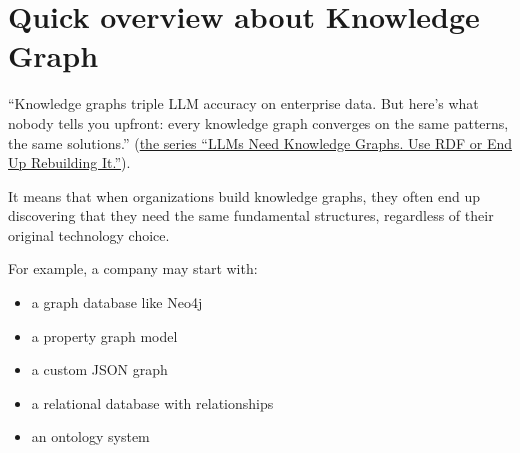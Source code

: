 \section{Quick overview about Knowledge Graph}

``Knowledge graphs triple LLM accuracy on enterprise data. But here's what nobody tells you upfront: every knowledge graph converges on the same patterns, the same solutions.''
(\href{https://bryon.io/why-rdf-is-the-natural-knowledge-layer-for-ai-systems-a5fd0b43d4c5}{the series “LLMs Need Knowledge Graphs. Use RDF or End Up Rebuilding It.”}).

It means that when organizations build knowledge graphs, they often end up discovering that they need the same fundamental structures, regardless of their original technology choice.

For example, a company may start with:
\begin{itemize}
  \item a graph database like Neo4j
  \item a property graph model
  \item a custom JSON graph
  \item a relational database with relationships
  \item an ontology system
\end{itemize}

